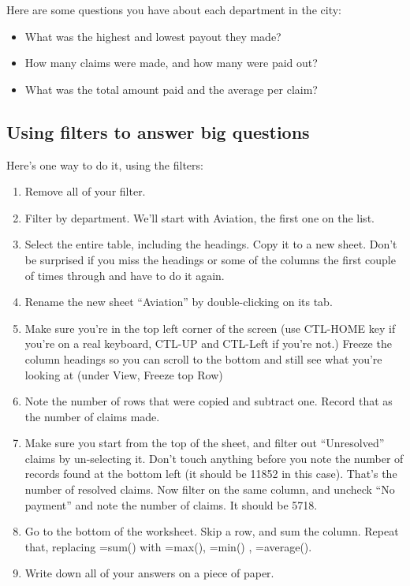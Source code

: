 \documentclass[
  letterpaper,
  DIV=11,
  numbers=noendperiod]{scrreprt}
\providecommand{\tightlist}{%
  \setlength{\itemsep}{0pt}\setlength{\parskip}{0pt}}\usepackage{longtable,booktabs,array}
\begin{document}
Here are some questions you have about each department in the city:

\begin{itemize}
\tightlist
\item
  What was the highest and lowest payout they made?
\item
  How many claims were made, and how many were paid out?
\item
  What was the total amount paid and the average per claim?
\end{itemize}

\hypertarget{using-filters-to-answer-big-questions}{%
\subsection{Using filters to answer big
questions}\label{using-filters-to-answer-big-questions}}

Here's one way to do it, using the filters:

\begin{enumerate}
\def\labelenumi{\arabic{enumi}.}
\tightlist
\item
  Remove all of your filter.
\item
  Filter by department. We'll start with Aviation, the first one on the
  list.
\item
  Select the entire table, including the headings. Copy it to a new
  sheet. Don't be surprised if you miss the headings or some of the
  columns the first couple of times through and have to do it again.\\
\item
  Rename the new sheet ``Aviation'' by double-clicking on its tab.
\item
  Make sure you're in the top left corner of the screen (use CTL-HOME
  key if you're on a real keyboard, CTL-UP and CTL-Left if you're not.)
  Freeze the column headings so you can scroll to the bottom and still
  see what you're looking at (under View, Freeze top Row)
\item
  Note the number of rows that were copied and subtract one. Record that
  as the number of claims made.
\item
  Make sure you start from the top of the sheet, and filter out
  ``Unresolved'' claims by un-selecting it. Don't touch anything before
  you note the number of records found at the bottom left (it should be
  11852 in this case). That's the number of resolved claims. Now filter
  on the same column, and uncheck ``No payment'' and note the number of
  claims. It should be 5718.
\item
  Go to the bottom of the worksheet. Skip a row, and sum the column.
  Repeat that, replacing =sum() with =max(), =min() , =average().
\item
  Write down all of your answers on a piece of paper.
\end{enumerate}
\end{document}
